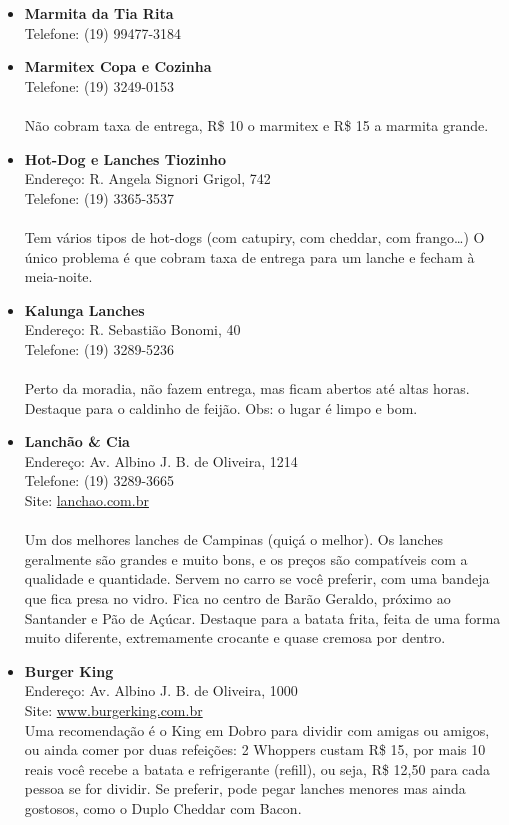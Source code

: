 \begin{itemize}
\item \textbf{Marmita da Tia Rita}
  \\Telefone: (19) 99477-3184

\item \textbf{Marmitex Copa e Cozinha}
  \\Telefone: (19) 3249-0153
  \\
  \\Não cobram taxa de entrega, R\$ 10 o marmitex e R\$ 15 a marmita grande.

\item \textbf{Hot-Dog e Lanches Tiozinho}
  \\Endereço: R. Angela Signori Grigol, 742
  \\Telefone: (19) 3365-3537
  \\
  \\Tem vários tipos de hot-dogs (com catupiry, com cheddar, com frango{\dots})
  O único problema é que cobram taxa de entrega para um lanche e fecham à
  meia-noite.

\item \textbf{Kalunga Lanches}
  \\Endereço: R. Sebastião Bonomi, 40
  \\Telefone: (19) 3289-5236
  \\
  \\Perto da moradia, não fazem entrega, mas ficam abertos até altas horas.
  Destaque para o caldinho de feijão. Obs: o lugar é limpo e bom.

\item \textbf{Lanchão \& Cia}
  \\Endereço: Av. Albino J. B. de Oliveira, 1214
  \\Telefone: (19) 3289-3665
  \\Site: \url{lanchao.com.br}
  \\
  \\Um dos melhores lanches de Campinas (quiçá o melhor). Os lanches geralmente
  são grandes e muito bons, e os preços são compatíveis com a qualidade e
  quantidade. Servem no carro se você preferir, com uma bandeja que fica presa
  no vidro. Fica no centro de Barão Geraldo, próximo ao Santander e Pão de
  Açúcar. Destaque para a batata frita, feita de uma forma muito diferente,
  extremamente crocante e quase cremosa por dentro.

\item \textbf{Burger King}
  \\Endereço: Av. Albino J. B. de Oliveira, 1000
  \\Site: \url{www.burgerking.com.br}
  \\Uma recomendação é o King em Dobro para dividir com amigas ou amigos, ou
  ainda comer por duas refeições: 2 Whoppers custam R\$ 15, por mais 10 reais
  você recebe a batata e refrigerante (refill), ou seja, R\$ 12,50 para cada
  pessoa se for dividir. Se preferir, pode pegar lanches menores mas ainda
  gostosos, como o Duplo Cheddar com Bacon.


\end{itemize}
